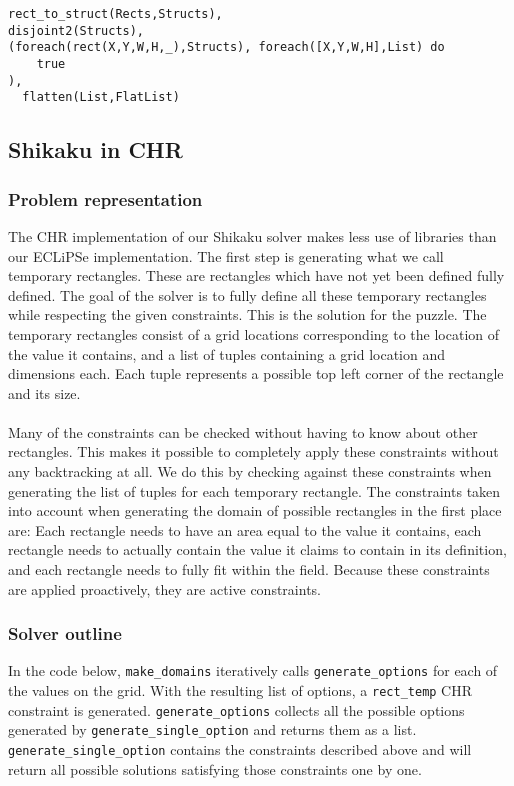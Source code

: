 \begin{lstlisting}
rect_to_struct(Rects,Structs),
disjoint2(Structs),
(foreach(rect(X,Y,W,H,_),Structs), foreach([X,Y,W,H],List) do
  	true
),
  flatten(List,FlatList)
\end{lstlisting}

\subsection{Shikaku in CHR}
\subsubsection{Problem representation}
The CHR implementation of our Shikaku solver makes less use of libraries than our ECLiPSe implementation. The first step is generating what we call temporary rectangles. These are rectangles which have not yet been defined fully defined. The goal of the solver is to fully define all these temporary rectangles while respecting the given constraints. This is the solution for the puzzle. The temporary rectangles consist of a grid locations corresponding to the location of the value it contains, and a list of tuples containing a grid location and dimensions each. Each tuple represents a possible top left corner of the rectangle and its size. 
\\ \\
Many of the constraints can be checked without having to know about other rectangles. This makes it possible to completely apply these constraints without any backtracking at all. We do this by checking against these constraints when generating the list of tuples for each temporary rectangle. The constraints taken into account when generating the domain of possible rectangles in the first place are: Each rectangle needs to have an area equal to the value it contains, each rectangle needs to actually contain the value it claims to contain in its definition, and each rectangle needs to fully fit within the field. Because these constraints are applied proactively, they are active constraints.

\subsubsection{Solver outline}
In the code below,  \texttt{make\_domains} iteratively calls \texttt{generate\_options} for each of the values on the grid. With the resulting list of options, a \texttt{rect\_temp} CHR constraint is generated. \texttt{generate\_options} collects all the possible options generated by \texttt{generate\_single\_option} and returns them as a list. \texttt{generate\_single\_option} contains the constraints described above and will return all possible solutions satisfying those constraints one by one. 


